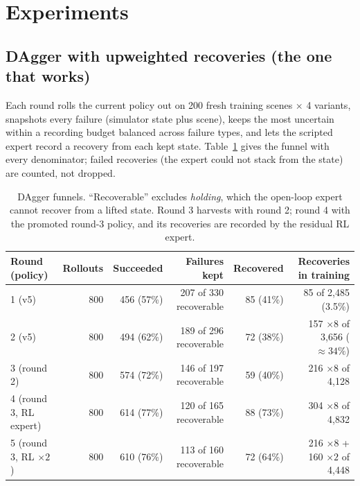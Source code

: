 \documentclass[10pt]{article}
\begin{document}
\section{Experiments}

\subsection{DAgger with upweighted recoveries (the one that works)}
Each round rolls the current policy out on 200 fresh training scenes $\times$ 4 variants, snapshots every failure
(simulator state plus scene), keeps the most uncertain within a recording budget balanced across failure types, and lets
the scripted expert record a recovery from each kept state. Table~\ref{tab:funnel} gives the funnel with every
denominator; failed recoveries (the expert could not stack from the state) are counted, not dropped.

\begin{table}[h]\centering\small
\begin{tabular}{lrrrrr}\toprule
Round (policy) & Rollouts & Succeeded & Failures kept & Recovered & Recoveries in training\\\midrule
1 (v5) & 800 & 456 (57\%) & 207 of 330 recoverable & 85 (41\%) & 85 of 2,485 (3.5\%)\\
2 (v5) & 800 & 494 (62\%) & 189 of 296 recoverable & 72 (38\%) & 157 $\times8$ of 3,656 ($\approx34\%$)\\
3 (round 2) & 800 & 574 (72\%) & 146 of 197 recoverable & 59 (40\%) & 216 $\times8$ of 4,128\\
4 (round 3, RL expert) & 800 & 614 (77\%) & 120 of 165 recoverable & 88 (73\%) & 304 $\times8$ of 4,832\\
5 (round 3, RL $\times2$) & 800 & 610 (76\%) & 113 of 160 recoverable & 72 (64\%) & 216 $\times8$ + 160 $\times2$ of 4,448\\\bottomrule
\end{tabular}
\caption{DAgger funnels. ``Recoverable'' excludes \emph{holding}, which the open-loop expert cannot recover from a lifted
state. Round 3 harvests with round 2; round 4 with the promoted round-3 policy, and its recoveries are recorded by the residual RL expert.}\label{tab:funnel}
\end{table}
\end{document}
